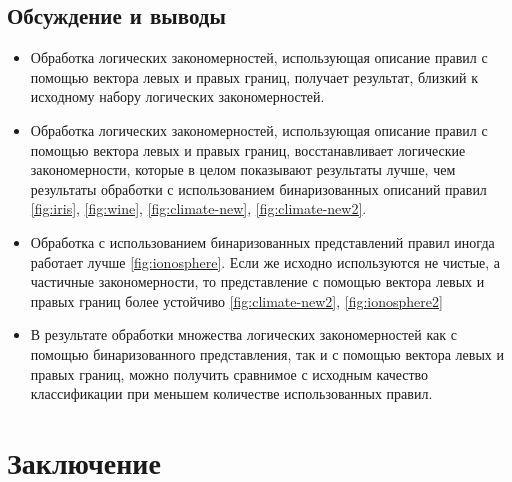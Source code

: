 \documentclass[12pt]{article}
\begin{document}
\subsection{Обсуждение и выводы}


\begin{itemize}
  \item Обработка логических закономерностей, использующая описание
    правил с помощью вектора левых и правых границ, получает
    результат, близкий к исходному набору логических закономерностей.
  \item Обработка логических закономерностей, использующая описание
    правил с помощью вектора левых и правых границ, восстанавливает
    логические закономерности, которые в целом показывают результаты
    лучше, чем результаты обработки с использованием бинаризованных
    описаний правил \ref{fig:iris}, \ref{fig:wine},
    \ref{fig:climate-new}, \ref{fig:climate-new2}.
  \item Обработка с использованием бинаризованных представлений правил
    иногда работает лучше \ref{fig:ionosphere}. Если же исходно
    используются не чистые, а частичные закономерности, то
    представление с помощью вектора левых и правых границ более
    устойчиво \ref{fig:climate-new2}, \ref{fig:ionosphere2}
  \item В результате обработки множества логических закономерностей
    как с помощью бинаризованного представления, так и с помощью
    вектора левых и правых границ, можно получить сравнимое с исходным
    качество классификации при меньшем количестве использованных
    правил.
\end{itemize}

\section{Заключение}

\end{document}
